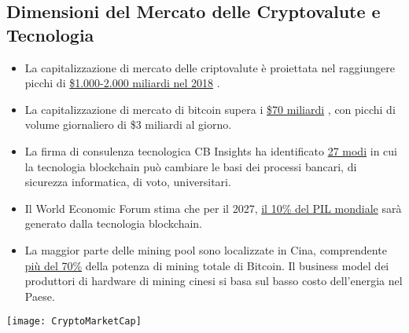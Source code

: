 \documentclass[11pt,fleqn]{book} %
\begin{document}
	\subsection{Dimensioni del Mercato delle Cryptovalute e Tecnologia}
		\begin{itemize}
			\item La capitalizzazione di mercato delle criptovalute è proiettata nel raggiungere picchi di 
			\href{https://www.ccn.com/cryptocurrency-market-cap-to-reach-2-trillion-in-2018-mike-novogratz/}{\$1.000-2.000 miliardi nel 2018}
			\cite{novograzPrediction}.
			\item La capitalizzazione di mercato di bitcoin supera i \href{https://coinmarketcap.com/currencies/bitcoin/historical-data/}{\$70 miliardi}
			\cite{coinmarketcapHistorical}, con picchi di volume giornaliero di \$3 miliardi al giorno.
			\item La firma di consulenza tecnologica CB Insights ha identificato \href{https://www.cbinsights.com/blog/industries-disrupted-blockchain/}{27 modi} 
			\cite{cbinsights} in cui la tecnologia blockchain può cambiare le basi dei processi bancari, di sicurezza informatica,
			di voto, universitari.
			\item Il World Economic Forum stima che per il 2027,
			\href{http://www3.weforum.org/docs/WEF_GAC15_Technological_Tipping_Points_report_2015.pdf}{il 10\% del PIL mondiale} \cite{wefTTP}
			sarà generato dalla tecnologia blockchain.
			\item La maggior parte delle mining pool sono localizzate in Cina, comprendente 
			\href{https://www.buybitcoinworldwide.com/mining/china/}{più del 70\%} \cite{bitcoinMiningChina}
			della potenza di mining totale di Bitcoin. Il business model dei produttori di hardware di mining cinesi si basa sul basso 
			costo dell'energia nel Paese. 
		\end{itemize}
		\begin{center}
			\texttt{[image: CryptoMarketCap]}
		\end{center}
\end{document}
